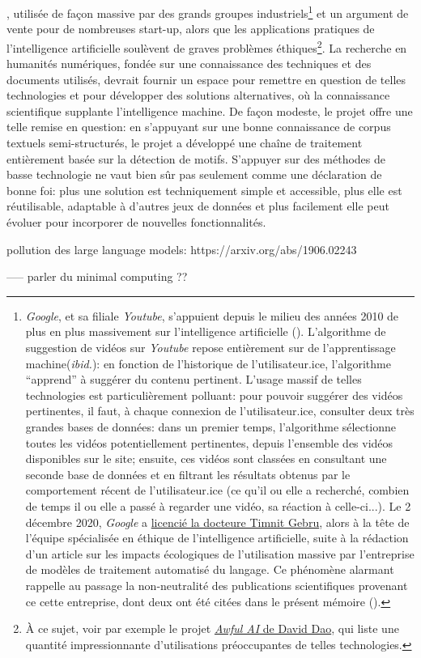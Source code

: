 {}, utilisée de façon massive par des grands groupes industriels\footnote{
	\textit{Google}, et sa filiale \textit{Youtube}, s'appuient depuis le milieu des années 2010 de plus en plus massivement sur l'intelligence artificielle (\cite[p. 1]{covington_deep_2016}). L'algorithme de suggestion de vidéos sur \textit{Youtube} repose entièrement sur de l'apprentissage machine(\textit{ibid.}): en fonction de l'historique de l'utilisateur.ice, l'algorithme \enquote{apprend} à suggérer du contenu pertinent. L'usage massif de telles technologies est particulièrement polluant: pour pouvoir suggérer des vidéos pertinentes, il faut, à chaque connexion de l'utilisateur.ice, consulter deux très grandes bases de données: dans un premier temps, l'algorithme sélectionne toutes les vidéos potentiellement pertinentes, depuis l'ensemble des vidéos disponibles sur le site; ensuite, ces vidéos sont classées en consultant une seconde base de données et en filtrant les résultats obtenus par le comportement récent de l'utilisateur.ice (ce qu'il ou elle a recherché, combien de temps il ou elle a passé à regarder une vidéo, sa réaction à celle-ci...). Le 2 décembre 2020, \textit{Google} a \href{https://googlewalkout.medium.com/setting-the-record-straight-isupporttimnit-believeblackwomen-5d7bbfe4ed90}{licencié la docteure Timnit Gebru}, alors à la tête de l'équipe spécialisée en éthique de l'intelligence artificielle, suite à la rédaction d'un article sur les impacts écologiques de l'utilisation massive par l'entreprise de modèles de traitement automatisé du langage. Ce phénomène alarmant rappelle au passage la non-neutralité des publications scientifiques provenant ce cette entreprise, dont deux ont été citées dans le présent mémoire (\cite{mikolov_efficient_2013, covington_deep_2016}).
} et un argument de vente pour de nombreuses start-up, alors que les applications pratiques de l'intelligence artificielle soulèvent de graves problèmes éthiques\footnote{À ce sujet, voir par exemple le projet \href{https://github.com/daviddao/awful-ai}{\textit{Awful AI} de David Dao}, qui liste une quantité impressionnante d'utilisations préoccupantes de telles technologies.}. La recherche en humanités numériques, fondée sur une connaissance des techniques et des documents utilisés, devrait fournir un espace pour remettre en question de telles technologies et pour développer des solutions alternatives, où la connaissance scientifique supplante l'intelligence machine. De façon modeste, le projet \mssktb{} offre une telle remise en question: en s'appuyant sur une bonne connaissance de corpus textuels semi-structurés, le projet a développé une chaîne de traitement entièrement basée sur la détection de motifs. S'appuyer sur des méthodes de basse technologie ne vaut bien sûr pas seulement comme une déclaration de bonne foi: plus une solution est techniquement simple et accessible, plus elle est réutilisable, adaptable à d'autres jeux de données et plus facilement elle peut évoluer pour incorporer de nouvelles fonctionnalités.


pollution des large language models:
https://arxiv.org/abs/1906.02243

----- parler du minimal computing ??
